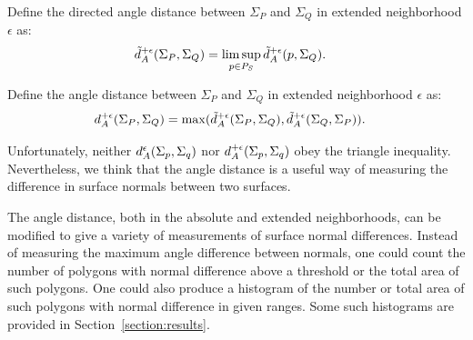 Define the directed angle distance between $\Sigma_P$ and $\Sigma_Q$
in extended neighborhood $\epsilon$ as:
\begin{align*}
\tilde{d}_A^{+\epsilon}(\Sigma_P,\Sigma_Q) & = \limsup_{p \in P_S} \tilde{d}_A^{+\epsilon}(p,\Sigma_Q).
\end{align*}

Define the angle distance between $\Sigma_P$ and $\Sigma_Q$
in extended neighborhood $\epsilon$ as:
\begin{align*}
d_A^{+\epsilon}(\Sigma_P,\Sigma_Q) & = 
\max(\tilde{d}_A^{+\epsilon}(\Sigma_P,\Sigma_Q), \tilde{d}_A^{+\epsilon}(\Sigma_Q,\Sigma_P)).
\end{align*}

Unfortunately, neither $d_A^\epsilon(\Sigma_p, \Sigma_q)$
nor $d_A^{+\epsilon}(\Sigma_p, \Sigma_q)$ obey the triangle inequality.
Nevertheless, we think that the angle distance is a useful way
of measuring the difference in surface normals between two surfaces.

The angle distance, both in the absolute and extended neighborhoods,
can be modified to give a variety of measurements of surface normal differences.
Instead of measuring the maximum angle difference between normals,
one could count the number of polygons with normal difference above
a threshold or the total area of such polygons.
One could also produce a histogram of the number or total area
of such polygons with normal difference in given ranges.
Some such histograms are provided in Section~\ref{section:results}.
